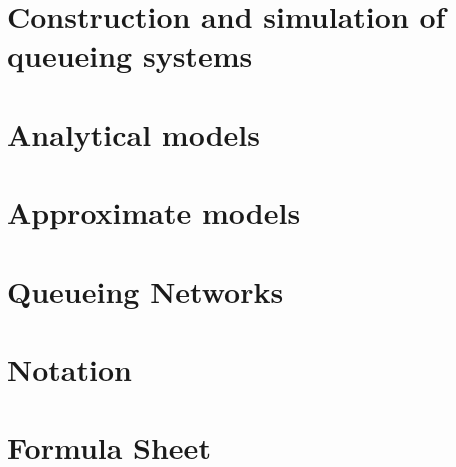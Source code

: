 \tableofcontents





\chapter{Construction and simulation of queueing systems}

\label{cha:single-stat-queu}










\chapter{Analytical models}













% 
%


\chapter{Approximate models}
 



%


\chapter{Queueing Networks}
\label{sec:notes-relat-chapt2}

%


%


%

%




\chapter*{Notation}
\label{sec:notation}


\chapter*{Formula Sheet}


\cleardoublepage
{}
{}
\printindex


